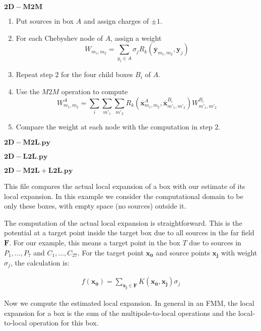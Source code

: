 \documentclass[11pt, oneside]{article}   	%
\begin{document}
\begin{appendices}
$\mathbf{2D-M2M}$
\begin{enumerate}
\item Put sources in box $A$ and assign charges of $\pm 1$.
\item For each Chebyshev node of $A$, assign a weight\\
$$W_{m_1,m_2}=\sum_{y_j\in A}\sigma_jR_k(\mathbf{\overline{y}}_{m_1,m_2},\mathbf{y}_j)$$
\item Repeat step $2$ for the four child boxes $B_i$ of $A$.
\item Use the $M2M$ operation to compute\\
$$W^A_{m_1,m_2}= \sum_{i}\sum_{m'_1}\sum_{m'_2} R_k(\mathbf{\overline{x}}^{A}_{m_1,m_2},\mathbf{\overline{x}}^{B_i}_{m'_1,m'_2})W^{B_i}_{m'_1,m'_2}$$
\item Compare the weight at each node with the computation in step $2$.
\end{enumerate}

$\mathbf{2D-M2L.py}$

$\mathbf{2D-L2L.py}$

$\mathbf{2D-M2L+L2L.py}$

This file compares the actual local expansion of a box with our estimate of its local expansion. In this example we consider the computational domain to be only these boxes, with empty space (no sources) outside it.

The computation of the actual local expansion is straightforward. This is the potential at a target point inside the target box due to all sources in the far field $\mathbf{F}$. For our example, this means a target point in the box $T$ due to sources in $P_1,\dots,P_7$ and $C_1,\dots,C_{27}$. For the target point $\mathbf{x_0}$ and source points $\mathbf{x_j}$ with weight $\sigma_j$, the calculation is:

\begin{align}
f(\mathbf{x_0}) = \sum_{\mathbf{x_j}\in \mathbf{F}} K(\mathbf{x_0},\mathbf{x_j})\sigma_j
\end{align}

Now we compute the estimated local expansion. In general in an FMM, the local expansion for a box is the sum of the multipole-to-local operations and the local-to-local operation for this box.


\end{appendices}
\end{document}
